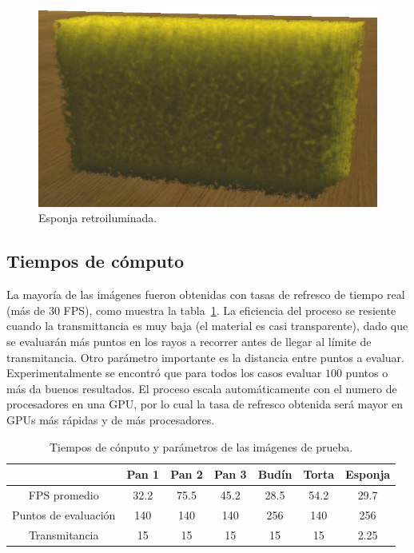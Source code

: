 \documentclass[oneside,a4paper,english,links]{amca}
\begin{document}
\begin{figure}[htb!]
  \centerline{\includegraphics[scale=0.25]{fig7}}
  \caption{Esponja retroiluminada.}
  \label{fg:fig7}
\end{figure}


\subsection{Tiempos de cómputo}

La mayoría de las imágenes fueron obtenidas con tasas de refresco de
tiempo real (más de 30 FPS), como muestra la tabla~\ref{tab:n1}. La
eficiencia del proceso se resiente cuando la transmittancia es muy
baja (el material es casi transparente), dado que se evaluarán más
puntos en los rayos a recorrer antes de llegar al límite de
transmitancia. Otro parámetro importante es la distancia entre puntos
a evaluar. Experimentalmente se encontró que para todos los casos
evaluar $100$ puntos o más da buenos resultados. El proceso escala
automáticamente con el numero de procesadores en una GPU, por lo cual
la tasa de refresco obtenida será mayor en GPUs más rápidas y de más
procesadores.

\begin{table}[htb]
\centering
\begin{tabular}{|c|c|c|c|c|c|c|}
\hline &  Pan 1 & Pan 2 & Pan 3 & Budín & Torta & Esponja \\
\hline
\hline
 FPS promedio  & 32.2 &  75.5 &  45.2 & 28.5 &  54.2 & 29.7\\
\hline
 Puntos de evaluación &  140 &  140 &  140 & 256 &  140 & 256 \\
\hline
 Transmitancia &  15 &  15 &  15 & 15 &  15 & 2.25 \\
\hline
\end{tabular}
\caption{Tiempos de cónputo y parámetros de las imágenes de prueba.}
\label{tab:n1}
\end{table}
\end{document}

